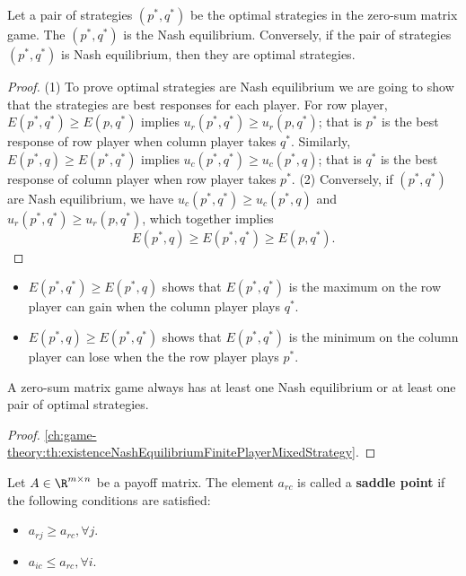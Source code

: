 \begin{refsection}
\begin{lemma}\label{ch:game-theory:th:OptimalStrategiesAreNashEquilibriumZeroSumMatrixGame}
	Let a pair of strategies $(p^*,q^*)$ be the optimal strategies in the zero-sum matrix game. The $(p^*,q^*)$ is the Nash equilibrium. Conversely, if the pair of strategies $(p^*,q^*)$ is Nash equilibrium, then they are optimal strategies.   	
\end{lemma}
\begin{proof}
(1) To prove optimal strategies are Nash equilibrium we are going to show that the strategies are best responses for each player. For row player, $ E(p^*,q^*) \geq E(p,q^*)$ implies $u_r(p^*,q^*) \geq u_r(p,q^*)$; that is $p^*$ is the best response of row player when column player takes $q^*$. Similarly, 	$E(p^*,q) \geq E(p^*,q^*)$ implies $u_c(p^*,q^*) \geq u_c(p^*,q)$; that is $q^*$ is the best response of column player when row player takes $p^*$.
(2) Conversely, if $(p^*,q^*)$ are Nash equilibrium, we have $u_c(p^*,q^*) \geq u_c(p^*,q)$ and $u_r(p^*,q^*) \geq u_r(p,q^*)$, which together implies 
$$E(p^*,q) \geq E(p^*,q^*) \geq E(p,q^*).$$
\end{proof}

\begin{remark}\hfill
	\begin{itemize}
		\item $E(p^*,q^*) \geq E(p^*,q)$ shows that $E(p^*,q^*)$ is the maximum on the row player can gain when the column player plays $q^*$.
		\item $E(p^*,q) \geq E(p^*,q^*)$ shows that $E(p^*,q^*)$ is the minimum on the column player can lose when the the row player plays $p^*$. 
	\end{itemize}	
\end{remark}

\begin{theorem}
	A zero-sum matrix game always has at least one Nash equilibrium or at least one pair of optimal strategies. 
\end{theorem}
\begin{proof}
\autoref{ch:game-theory:th:existenceNashEquilibriumFinitePlayerMixedStrategy}.	
\end{proof}

\begin{definition}
	Let $A\in \R^{m\times n}$ be a payoff matrix. The element $a_{rc}$ is called a \textbf{saddle point} if the following conditions are satisfied:
	\begin{itemize}
		\item $a_{rj}\geq a_{rc}, \forall j$.
		\item $a_{ic}\leq a_{rc}, \forall i$.
	\end{itemize}	


\end{definition}
\end{refsection}
